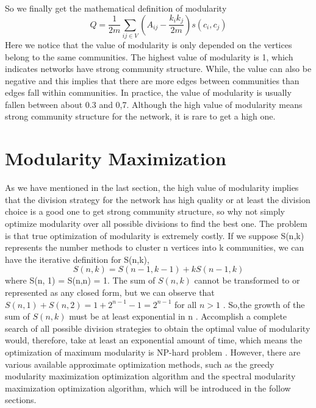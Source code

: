 \documentclass[12pt,oneside,final]{vlsithesis}
\begin{document}
So we finally get the mathematical definition of modularity 
\begin{equation}
Q   =  \frac{1}{2m}\sum_{ij \in V}(A_{ij} - \dfrac{k_{i}k_{j}}{2m}) s(c_{i}, c_{j})
\end{equation}
Here we notice that the value of modularity is only depended on the vertices belong to the same communities. The highest value of modularity is 1, which indicates networks have strong community structure. While, the value can also be negative and this implies that there are more edges between communities than edges fall within communities. In practice, the value of modularity is usually fallen between about 0.3 and 0,7. Although the high value of modularity means strong community structure for the network, it is rare to get a high one.
\section{Modularity Maximization}
As we have mentioned in the last section, the high value of modularity implies that the division strategy for the network has high quality or at least the division choice is a good one to get strong community structure, so why not simply optimize modularity over all possible divisions to find the best one. The problem is that true optimization of modularity is extremely costly. If we suppose S(n,k) represents the number methods to cluster n vertices into k communities, we can have the iterative definition for S(n,k), 
\begin{equation}
S(n,k) = S(n-1, k-1) + k S(n-1, k)  
\end{equation}
where S(n, 1) = S(n,n) = 1. The sum of $S(n,k)$ cannot be transformed to or represented as any closed form, but we can observe that  $S(n,1) + S(n,2) = 1 + 2^{n-1} - 1 = 2^{n-1}$ for all $ n > 1 $ \cite{newman2004fast}.  So,the growth of  the sum of $S(n,k)$ must be at least exponential in n .  Accomplish a complete search of all possible division strategies to obtain the optimal value of modularity would, therefore, take at least an exponential amount of time, which means the optimization of maximum modularity is NP-hard problem \cite{brandes2007finding}.  However,  there are various available approximate optimization methods, such as the greedy modularity maximization optimization algorithm and the spectral modularity maximization optimization algorithm, which will be introduced in the follow sections.
\end{document}
